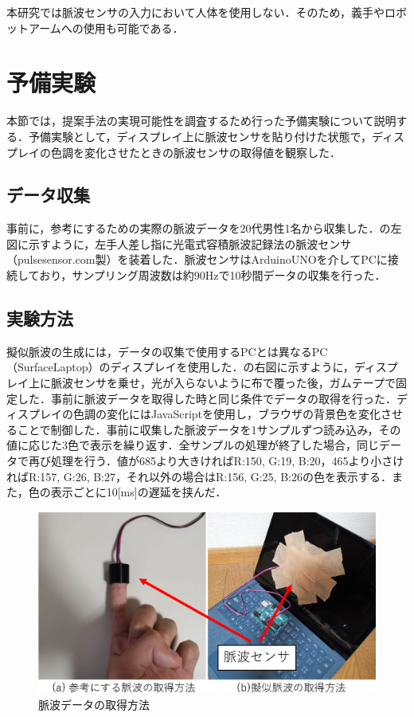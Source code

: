 \documentclass[submit,techrep]{ipsj}
\begin{document}
本研究では脈波センサの入力において人体を使用しない．そのため，義手やロボットアームへの使用も可能である．





\section{予備実験}
\label{preliminary}
本節では，提案手法の実現可能性を調査するため行った予備実験について説明する．予備実験として，ディスプレイ上に脈波センサを貼り付けた状態で，ディスプレイの色調を変化させたときの脈波センサの取得値を観察した．


\subsection{データ収集}
事前に，参考にするための実際の脈波データを20代男性1名から収集した．の左図に示すように，左手人差し指に光電式容積脈波記録法の脈波センサ（pulsesensor.com製）を装着した．脈波センサはArduinoUNOを介してPCに接続しており，サンプリング周波数は約90Hzで10秒間データの収集を行った．


\subsection{実験方法}
擬似脈波の生成には，データの収集で使用するPCとは異なるPC（SurfaceLaptop）のディスプレイを使用した．の右図に示すように，ディスプレイ上に脈波センサを乗せ，光が入らないように布で覆った後，ガムテープで固定した．事前に脈波データを取得した時と同じ条件でデータの取得を行った．ディスプレイの色調の変化にはJavaScriptを使用し，ブラウザの背景色を変化させることで制御した．事前に収集した脈波データを1サンプルずつ読み込み，その値に応じた3色で表示を繰り返す．全サンプルの処理が終了した場合，同じデータで再び処理を行う．値が685より大きければR:150, G:19, B:20，465より小さければR:157, G:26, B:27，それ以外の場合はR:156, G:25, B:26の色を表示する．また，色の表示ごとに10[ms]の遅延を挟んだ．

\begin{figure}[!ht]
	\begin{center}
		\includegraphics[width=1\linewidth]{sensors.eps}
	\end{center}
	\vspace{-8mm}
	\caption{脈波データの取得方法}
	\label{fig:sensors}
\end{figure}
\end{document}
